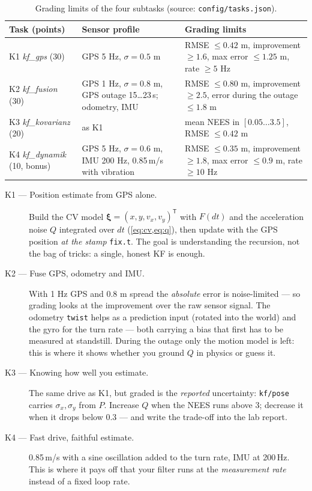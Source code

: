 \documentclass[12pt,a4paper]{scrartcl}
\newcommand{\thema}[1]{\texttt{#1}}
\newcommand{\ordner}[1]{\texttt{#1}}
\begin{document}
\begin{table}[ht]\centering\small
\caption{Grading limits of the four subtasks (source: \ordner{config/tasks.json}).}
\label{tab:aufgaben}
\begin{tabular}{@{}lp{3.3cm}p{6.6cm}@{}}
\toprule
Task (points) & Sensor profile & Grading limits \\
\midrule
K1 \textit{kf\_gps} (30) & GPS 5 Hz, \(\sigma=0.5\) m & RMSE \(\le 0.42\) m,
  improvement \(\ge 1.6\), max error \(\le 1.25\) m, rate \(\ge 5\) Hz \\
K2 \textit{kf\_fusion} (30) & GPS 1 Hz, \(\sigma=0.8\) m, GPS outage 15…23\,s; odometry, IMU
  & RMSE \(\le 0.80\) m, improvement \(\ge 2.5\), error during the outage \(\le 1.8\) m \\
K3 \textit{kf\_kovarianz} (20) & as K1 & mean NEES in \([0.05\ldots3.5]\),
  RMSE \(\le 0.42\) m \\
K4 \textit{kf\_dynamik} (10, bonus) & GPS 5 Hz, \(\sigma=0.6\) m, IMU 200 Hz,
  0.85\,m/s with vibration & RMSE \(\le 0.35\) m, improvement \(\ge 1.8\),
  max error \(\le 0.9\) m, rate \(\ge 10\) Hz \\
\bottomrule
\end{tabular}
\end{table}

\begin{description}
  \item[K1 — Position estimate from GPS alone.] Build the CV model
    \(\boldsymbol\xi=(x,y,v_x,v_y)^{\mathsf T}\) with \(F(dt)\) and the acceleration noise
    \(Q\) integrated over \(dt\) (\cref{eq:cv,eq:q}), then update with
    the GPS position \emph{at the stamp} \thema{fix.t}. The goal is understanding the
    recursion, not the bag of tricks: a single, honest KF is enough.
  \item[K2 — Fuse GPS, odometry and IMU.] With 1 Hz GPS and \(0.8\) m spread the
    \emph{absolute} error is noise-limited — so grading looks at the improvement over the
    raw sensor signal. The odometry \thema{twist} helps as a prediction input (rotated into
    the world) and the gyro for the turn rate — both carrying a bias that first has to be
    measured at standstill. During the outage only the motion model is left: this is where
    it shows whether you ground \(Q\) in physics or guess it.
  \item[K3 — Knowing how well you estimate.] The same drive as K1, but graded is the
    \emph{reported} uncertainty: \thema{kf/pose} carries \(\sigma_x,\sigma_y\) from \(P\).
    Increase \(Q\) when the NEES runs above 3; decrease it when it drops below 0.3
    — and write the trade-off into the lab report.
  \item[K4 — Fast drive, faithful estimate.] 0.85\,m/s with a sine oscillation added to
    the turn rate, IMU at 200\,Hz. This is where it pays off that your filter runs at the
    \emph{measurement rate} instead of a fixed loop rate.
\end{description}
\end{document}
